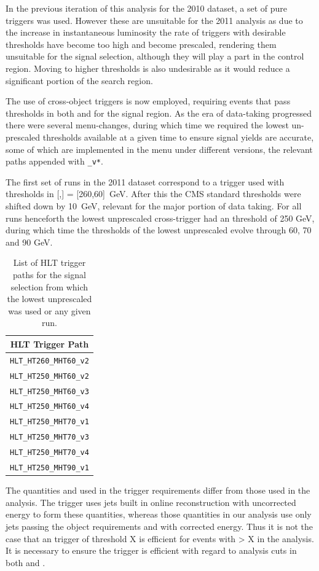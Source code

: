 In the previous iteration of this analysis for the 2010 dataset, a set of pure \HT triggers was used. However these are unsuitable for the 2011 analysis as due to the increase in instantaneous luminosity the rate of triggers with desirable thresholds have become too high and become prescaled, rendering them unsuitable for the signal selection, although they will play a part in the control region. Moving to higher \HT thresholds is also undesirable as it would reduce a significant portion of the search region.

The use of cross-object triggers is now employed, requiring events that pass thresholds in both \HT and \mht for the signal region. As the era of data-taking progressed there were several menu-changes, during which time we required the lowest un-prescaled thresholds available at a given time to ensure signal yields are accurate, some of which are implemented in the menu under different versions, the relevant paths appended with \verb!_v*!.

The first set of runs in the 2011 dataset correspond to a trigger used with thresholds in [\HT,\MHT] = [260,60]~GeV. After this the CMS standard thresholds were shifted down by 10~GeV, relevant for the major portion of data taking. For all runs henceforth the lowest unprescaled cross-trigger had an \HT threshold of 250 GeV, during which time the \MHT thresholds of the lowest unprescaled evolve through 60, 70 and 90 GeV.

\begin{table}[htbp]
\centering
\begin{tabular}{c}
\hline
\hline
HLT Trigger Path\\
\hline
\hline
\verb!HLT_HT260_MHT60_v2!\\
\verb!HLT_HT250_MHT60_v2!\\
\verb!HLT_HT250_MHT60_v3!\\
\verb!HLT_HT250_MHT60_v4!\\
\verb!HLT_HT250_MHT70_v1!\\
\verb!HLT_HT250_MHT70_v3!\\
\verb!HLT_HT250_MHT70_v4!\\
\verb!HLT_HT250_MHT90_v1!\\
\hline
\end{tabular}
\caption{\label{tab:sigtrig}List of HLT trigger paths for the signal selection from which the lowest unprescaled was used or any given run.}
\end{table}

The quantities \HT and \MHT used in the trigger requirements differ from those used in the analysis. The trigger uses jets built in online reconstruction with uncorrected energy to form these quantities, whereas those quantities in our analysis use only jets passing the object requirements and with corrected energy. Thus it is not the case that an \HT trigger of threshold X is efficient for events with \HT > X in the analysis. It is necessary to ensure the trigger is efficient with regard to analysis cuts in both \HT and \MHT.

